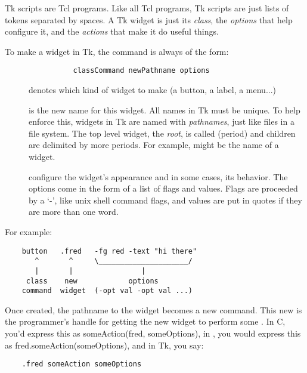 Tk scripts are Tcl programs.  Like all Tcl programs, Tk scripts are
just lists of tokens separated by spaces.  A Tk widget is just its
\emph{class}, the \emph{options} that help configure it, and the
\emph{actions} that make it do useful things. 

To make a widget in Tk, the command is always of the form: 

\begin{verbatim}
                classCommand newPathname options
\end{verbatim}

\begin{description}
\item[]
denotes which kind of widget to make (a button, a label, a menu...)

\item[]
is the new name for this widget.  All names in Tk must be unique.  To
help enforce this, widgets in Tk are named with \emph{pathnames}, just
like files in a file system.  The top level widget, the \emph{root},
is called  (period) and children are delimited by more
periods.  For example,  might be
the name of a widget.

\item[ ]
configure the widget's appearance and in some cases, its
behavior.  The options come in the form of a list of flags and values.
Flags are proceeded by a `-', like unix shell command flags, and
values are put in quotes if they are more than one word.
\end{description}

For example: 

\begin{verbatim}
    button   .fred   -fg red -text "hi there"
       ^       ^     \_____________________/
       |       |                |
     class    new            options
    command  widget  (-opt val -opt val ...)
\end{verbatim} 

Once created, the pathname to the widget becomes a new command.  This
new  is the programmer's handle for getting the new
widget to perform some .  In C, you'd express this as
someAction(fred, someOptions), in \Cpp, you would express this as
fred.someAction(someOptions), and in Tk, you say: 

\begin{verbatim}
    .fred someAction someOptions 
\end{verbatim} 

